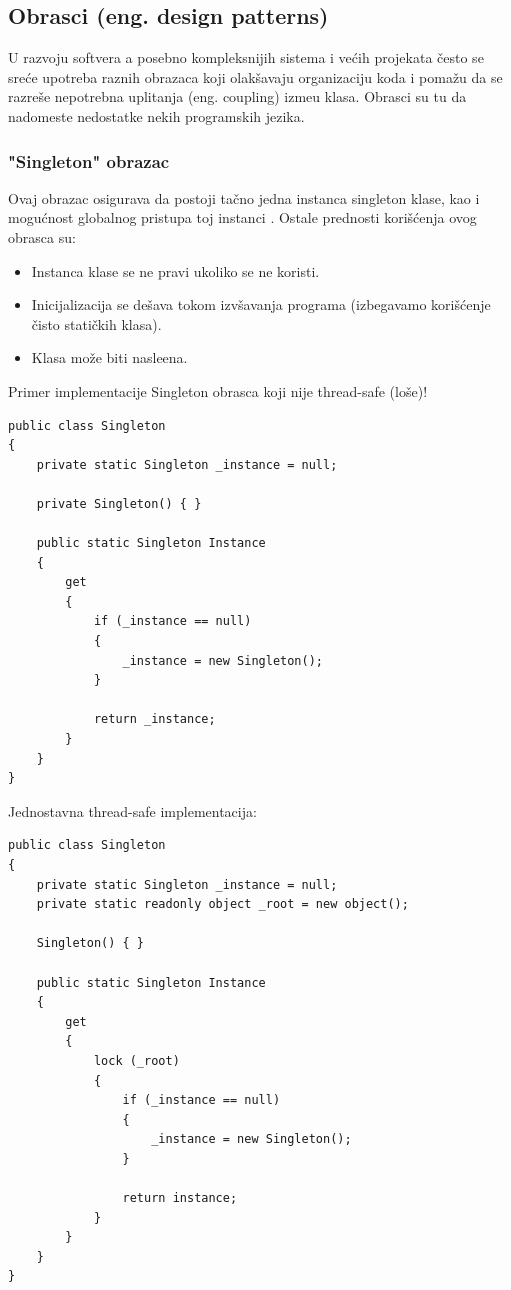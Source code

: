 \subsection{Obrasci (eng. design patterns)}
U razvoju softvera a posebno kompleksnijih sistema i ve\'cih projekata \v{c}esto se sre\'ce upotreba raznih
obrazaca koji olak\v{s}avaju organizaciju koda i poma\v{z}u da se razre\v{s}e nepotrebna uplitanja (eng. coupling)
izme\dj u klasa. Obrasci su tu da nadomeste nedostatke nekih programskih jezika.

\subsubsection{"Singleton" obrazac}
Ovaj obrazac osigurava da postoji ta\v{c}no jedna instanca singleton klase, kao i mogu\'cnost globalnog pristupa toj instanci \cite{gameprog}.
Ostale prednosti kori\v{s}\'cenja ovog obrasca su:

\begin{itemize}
    \item Instanca klase se ne pravi ukoliko se ne koristi.
    \item Inicijalizacija se de\v{s}ava tokom izv\v{s}avanja programa (izbegavamo kori\v{s}\'cenje \v{c}isto stati\v{c}kih klasa).
    \item Klasa mo\v{z}e biti nasle\dj ena. 
\end{itemize}

Primer implementacije Singleton obrasca koji nije thread-safe (lo\v{s}e)!
\begin{verbatim}
public class Singleton
{
    private static Singleton _instance = null;

    private Singleton() { }

    public static Singleton Instance
    {
        get
        {
            if (_instance == null)
            {
                _instance = new Singleton();
            }
            
            return _instance;
        }
    }
}
\end{verbatim}

Jednostavna thread-safe implementacija:
\begin{verbatim}
public class Singleton
{
    private static Singleton _instance = null;
    private static readonly object _root = new object();

    Singleton() { }

    public static Singleton Instance
    {
        get
        {
            lock (_root)
            {
                if (_instance == null)
                {
                    _instance = new Singleton();
                }

                return instance;
            }
        }
    }
}
\end{verbatim}

